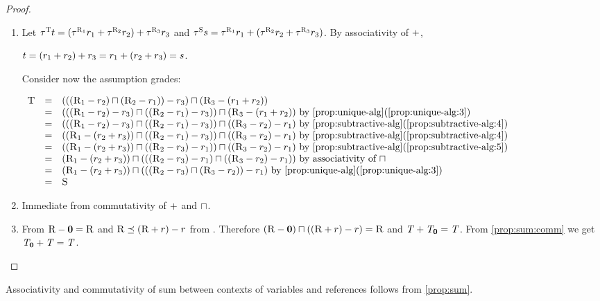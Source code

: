 \begin{proof}\hfill
\begin{enumerate}
\item
Let $\tau^{\textsc{T}}{t}=(\tau^{\textsc{R}_1}{r_1}+\tau^{\textsc{R}_2}{r_2})+\tau^{\textsc{R}_3}{r_3}$ and
$\tau^{\textsc{S}}{s}=\tau^{\textsc{R}_1}{r_1}+(\tau^{\textsc{R}_2}{r_2}+\tau^{\textsc{R}_3}{r_3})$. By associativity of $+$,
\begin{center}
$t=(r_1+r_2)+r_3=r_1+(r_2+r_3)=s$.
\end{center}
Consider now the assumption grades:
\begin{center}
$
\begin{array}{lcl}
\Tgr&=& (((\Rgr_1 \rsub \rgr_2) \rmeet (\Rgr_2 \rsub \rgr_1))\rsub\rgr_3)\rmeet(\Rgr_3 \rsub (\rgr_1\rsum\rgr_2))\\
&=& (((\Rgr_1 \rsub \rgr_2)\rsub\rgr_3) \rmeet ((\Rgr_2 \rsub \rgr_1)\rsub\rgr_3))\rmeet(\Rgr_3 \rsub (\rgr_1\rsum\rgr_2))\text{ by \refItem{prop:unique-alg}{3}}\\
&=& (((\Rgr_1 \rsub \rgr_2)\rsub\rgr_3) \rmeet ((\Rgr_2 \rsub \rgr_1)\rsub\rgr_3))\rmeet((\Rgr_3 \rsub\rgr_2)\rsub\rgr_1)\text{ by \refItem{prop:subtractive-alg}{4}}\\
&=&((\Rgr_1 \rsub( \rgr_2\rsum\rgr_3)) \rmeet ((\Rgr_2 \rsub \rgr_1)\rsub\rgr_3))\rmeet((\Rgr_3 \rsub\rgr_2)\rsub\rgr_1)\text{ by \refItem{prop:subtractive-alg}{4}}\\
&=& ((\Rgr_1 \rsub( \rgr_2\rsum\rgr_3)) \rmeet ((\Rgr_2 \rsub \rgr_3)\rsub\rgr_1))\rmeet((\Rgr_3 \rsub\rgr_2)\rsub\rgr_1)\text{ by \refItem{prop:subtractive-alg}{5}}\\
&=& (\Rgr_1 \rsub( \rgr_2\rsum\rgr_3)) \rmeet (((\Rgr_2 \rsub \rgr_3)\rsub\rgr_1)\rmeet((\Rgr_3 \rsub\rgr_2)\rsub\rgr_1))\text{ by associativity of $\rmeet$}\\
&=& (\Rgr_1 \rsub( \rgr_2\rsum\rgr_3)) \rmeet (((\Rgr_2 \rsub \rgr_3)\rmeet(\Rgr_3 \rsub\rgr_2)) \rsub\rgr_1)\text{ by \refItem{prop:unique-alg}{3}}\\
&=&\Sgr
\end{array}
$
\end{center}
\item Immediate from commutativity of $+$ and $\sqcap$.
\item From  $\textsc{R}-\mathbf{0}=\textsc{R}$ and $\textsc{R}\preceq(\textsc{R}+r)-r$ from . Therefore
$(\textsc{R}-\mathbf{0})\sqcap((\textsc{R}+r)-r)=\textsc{R}$ and $\mathit{T}+\mathit{T}_{\mathbf{0}}=\mathit{T}$. From \cref{prop:sum:comm}  we get $\mathit{T}_{\mathbf{0}}+\mathit{T}=\mathit{T}$.
\end{enumerate}
\end{proof}
Associativity and commutativity of sum between contexts of variables and references follows from \cref{prop:sum}.

